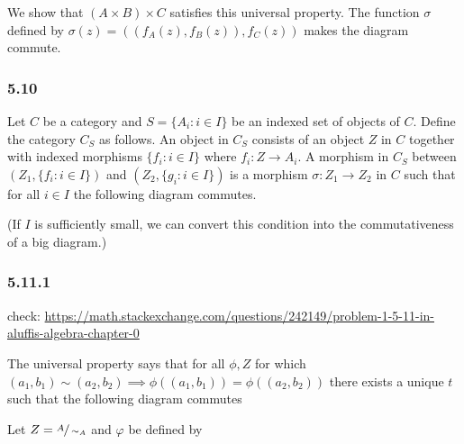 \documentclass{article}
\begin{document}
We show that $(A \times B) \times C$ satisfies this universal property. The function $\sigma$ defined by $\sigma(z) = ((f_A(z), f_B(z)), f_C(z))$ makes the diagram commute.

\subsubsection*{5.10}

Let $C$ be a category and $S = \{A_i : i \in I\}$ be an indexed set of objects of $C$. Define the category $C_S$ as follows. An object in $C_S$ consists of an object $Z$ in $C$ together with indexed morphisms $\{f_i : i \in I\}$ where $f_i : Z \to A_i$. A morphism in $C_S$ between $(Z_1, \{f_i : i \in I\})$ and $(Z_2, \{g_i : i \in I\})$ is a morphism $\sigma: Z_1 \to Z_2$ in $C$ such that for all $i \in I$ the following diagram commutes.


(If $I$ is sufficiently small, we can convert this condition into the commutativeness of a big diagram.)

\subsubsection*{5.11.1}

check: \url{https://math.stackexchange.com/questions/242149/problem-1-5-11-in-aluffis-algebra-chapter-0}

The universal property says that for all $\phi, Z$ for which $(a_1, b_1) \sim (a_2, b_2) \implies \phi((a_1, b_1)) = \phi((a_2, b_2))$ there exists a unique $t$ such that the following diagram commutes


Let $Z = \sfrac{A}{\sim_A}$ and $\varphi$ be defined by

\end{document}
